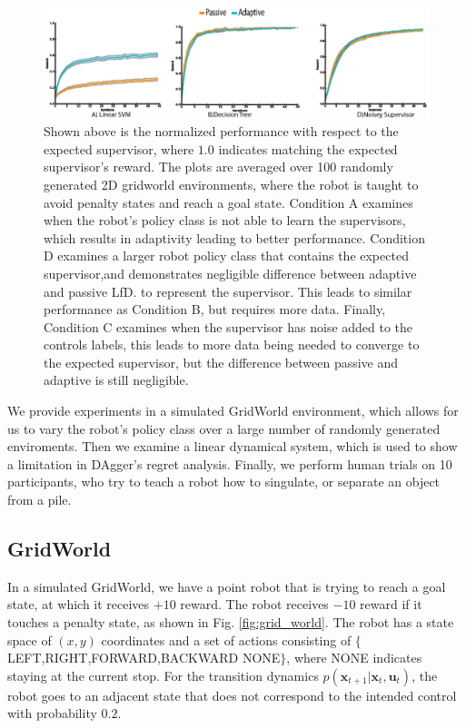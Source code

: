 \documentclass[10pt, conference]{ieeeconf}      %
\newcommand{\bu}{\mathbf{u}}
\newcommand{\bx}{\mathbf{x}}
\begin{document}
\begin{figure}
\includegraphics{f_figs/var_grid.eps}
\caption{
    \footnotesize
Shown above is the normalized performance with respect to the expected supervisor, where $1.0$ indicates matching the expected supervisor's reward. The plots are averaged over 100 randomly generated 2D gridworld environments,  where the robot is taught to avoid penalty states and reach a goal state. Condition A examines when the robot's policy class is not able to learn the supervisors, which results in adaptivity leading to better performance. Condition D examines a larger robot policy class that contains the expected supervisor,and demonstrates negligible difference between adaptive and passive LfD.  to represent the supervisor. This leads to similar performance as Condition B, but requires more data. Finally, Condition C examines when the supervisor has noise added to the controls labels, this leads to more data being needed to converge to the expected supervisor, but the difference between passive and adaptive is still negligible.   }
\vspace*{-20pt}
\label{fig:var}
\end{figure}

We provide experiments in a simulated GridWorld environment, which allows for us to vary the robot's policy class over a large number of randomly generated enviroments. Then we examine a linear dynamical system, which is used to show a limitation in DAgger's regret analysis. Finally, we perform human trials on 10 participants, who try to teach a robot how to singulate, or separate an object from a pile. 

\subsection{GridWorld}\label{sec:gdw}
In a simulated GridWorld, we have a point robot that is trying to reach a goal state, at which it receives $+10$ reward. The robot receives $-10$ reward if it touches a penalty state, as shown in Fig. \ref{fig:grid_world}. The robot has a state space of $(x,y)$ coordinates and a set of actions consisting of $\lbrace$LEFT,RIGHT,FORWARD,BACKWARD NONE$\rbrace$, where NONE indicates staying at the current stop. For the transition dynamics $p(\bx_{t+1}|\bx_{t},\bu_t)$, the robot goes to an adjacent state that does not correspond to the intended control with probability $0.2$. 
\end{document}
